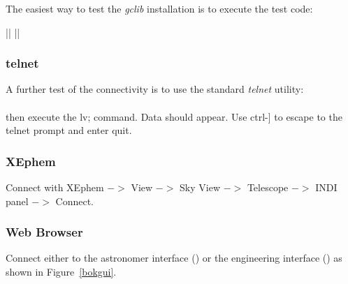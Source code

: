 \documentclass[12pt,twoside]{article}
\begin{document}
The easiest way to test the \emph{gclib} installation is to execute the test code: \\


 ||  ||  \\

\subsubsection{telnet}

A further test of the connectivity is to use the standard \emph{telnet} utility: \\

 \\

\noindent then execute the {\sc lv;} command. Data should appear. Use {\sc ctrl-]} to escape to the telnet prompt and 
enter {\sc quit}.

\subsubsection{XEphem}

Connect with XEphem $->$ View $->$ Sky View $->$ Telescope $->$ INDI panel $->$ Connect.

\subsubsection{Web Browser}

Connect either to the astronomer interface () or the engineering interface 
() as shown in Figure~\ref{bokgui}.
\end{document}
